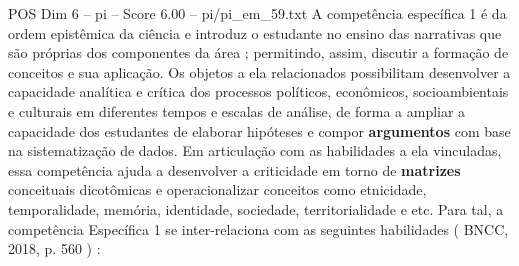 \begin{textsample}{POS Dim 6 – pi – Score 6.00 – pi/pi\_em\_59.txt}
A competência específica 1 é da ordem epistêmica da ciência e introduz o estudante no ensino das narrativas que são próprias dos componentes da área ; permitindo, assim, discutir a formação de conceitos e sua aplicação.
Os objetos a ela relacionados possibilitam desenvolver a capacidade analítica e crítica dos processos políticos, econômicos, socioambientais e culturais em diferentes tempos e escalas de análise, de forma a ampliar a capacidade dos estudantes de elaborar hipóteses e compor \textbf{argumentos} com base na sistematização de dados.
Em articulação com as habilidades a ela vinculadas, essa competência ajuda a desenvolver a criticidade em torno de \textbf{matrizes} conceituais dicotômicas e operacionalizar conceitos como etnicidade, temporalidade, memória, identidade, sociedade, territorialidade e etc.
Para tal, a competência Específica 1 se inter-relaciona com as seguintes habilidades ( BNCC, 2018, p. 560 ) :

\end{textsample}
